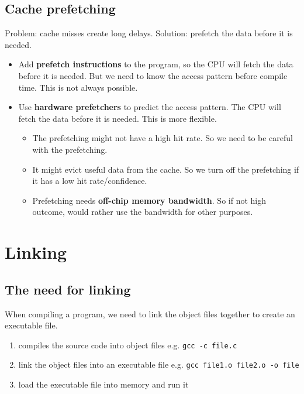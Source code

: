 \documentclass[letterpaper,12pt]{article}
\begin{document}
\subsection{Cache prefetching}
Problem: cache misses create long delays. Solution: prefetch the data before it is needed.
\begin{itemize}
    \item Add \textbf{prefetch instructions} to the program, so the CPU will fetch the data before it is needed. But we need to know the access pattern before compile time. This is not always possible.
    \item Use \textbf{hardware prefetchers} to predict the access pattern. The CPU will fetch the data before it is needed. This is more flexible.\begin{itemize}
        \item The prefetching might not have a high hit rate. So we need to be careful with the prefetching.
        \item It might evict useful data from the cache. So we turn off the prefetching if it has a low hit rate/confidence. 
        \item Prefetching needs \textbf{off-chip memory bandwidth}. So if not high outcome, would rather use the bandwidth for other purposes.
    \end{itemize}
\end{itemize}
\section{Linking}
\subsection{The need for linking}
When compiling a program, we need to link the object files together to create an executable file.\begin{enumerate}
    \item compiles the source code into object files e.g. \texttt{gcc -c file.c}
    \item link the object files into an executable file e.g. \texttt{gcc file1.o file2.o -o file}
    \item load the executable file into memory and run it
\end{enumerate}
\end{document}
